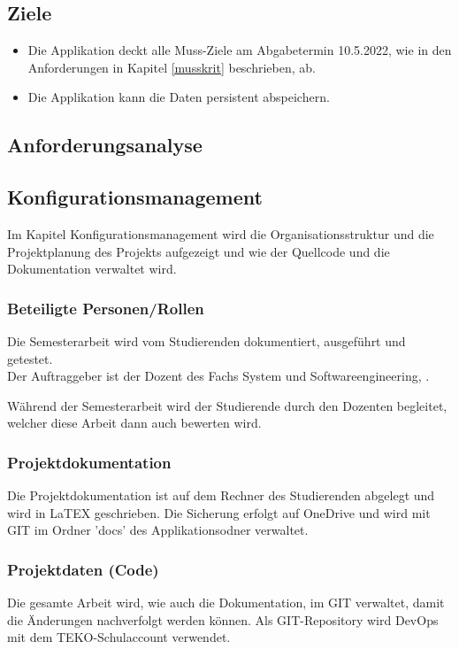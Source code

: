 \subsection{Ziele}
\begin{itemize}
  \item Die Applikation deckt alle Muss-Ziele am Abgabetermin 10.5.2022, wie in den Anforderungen in Kapitel \ref{musskrit} beschrieben, ab.
  \item Die Applikation kann die Daten persistent abspeichern.
\end{itemize}

\subsection{Anforderungsanalyse}


\subsection{Konfigurationsmanagement}
Im Kapitel Konfigurationsmanagement wird die Organisationsstruktur und die Projektplanung des Projekts aufgezeigt und wie der Quellcode und die Dokumentation verwaltet wird.

\subsubsection{Beteiligte Personen/Rollen}
Die Semesterarbeit wird vom Studierenden dokumentiert, ausgeführt und getestet.\\
Der Auftraggeber ist der Dozent des Fachs System und Softwareengineering, \gutachter.

Während der Semesterarbeit wird der Studierende durch den Dozenten \gutachter begleitet, welcher diese Arbeit dann auch bewerten wird.

\subsubsection{Projektdokumentation}
Die Projektdokumentation ist auf dem Rechner des Studierenden abgelegt und wird in LaTEX geschrieben. Die Sicherung erfolgt auf OneDrive und wird mit GIT im Ordner 'docs' des Applikationsodner verwaltet. 

\subsubsection{Projektdaten (Code)}
Die gesamte Arbeit wird, wie auch die Dokumentation, im GIT verwaltet, damit die Änderungen nachverfolgt werden können. Als GIT-Repository wird DevOps mit dem TEKO-Schulaccount verwendet.

